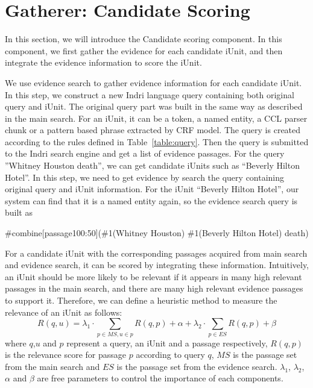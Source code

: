 \section{Gatherer: Candidate Scoring}
In this section, we will introduce the Candidate scoring component.
In this component, we first gather the evidence for each candidate iUnit, and then integrate the evidence information to score the iUnit.

We use evidence search to gather evidence information for each candidate iUnit.
In this step, we construct a new Indri language query containing both original query and iUnit.
The original query part was built in the same way as described in the main search.
For an iUnit, it can be a token, a named entity, a CCL parser chunk or a pattern based phrase extracted by CRF model.
The query is created according to the rules defined in Table~\ref{table:query}.
Then the query is submitted to the Indri search engine and get a list of evidence passages.
For the query ''Whitney Houston death'', we can get candidate iUnits such as ``Beverly Hilton Hotel''. 
In this step, we need to get evidence by search the query containing original query and iUnit information.
For the iUnit ``Beverly Hilton Hotel'', our system can find that it is a named entity again, so the evidence search query is built as 

\begin{center}
\#combine[passage100:50](\#1(Whitney Houston) \#1(Beverly Hilton Hotel) death)
\end{center}

For a candidate iUnit with the corresponding passages acquired from main search and evidence search, it can be scored by integrating these information.
Intuitively, an iUnit should be more likely to be relevant if it appears in many high relevant passages in the main search, and there are many high relevant evidence passages to support it.
Therefore, we can define a heuristic method to measure the relevance of an iUnit as follows:
\begin{equation}
R(q,u)= \lambda_1 \cdot \sum_{p\in MS, u\in p}{R(q,p) + \alpha} + \lambda_2 \cdot \sum_{p\in ES}{R(q,p) + \beta}
\end{equation}
where $q$,$u$ and $p$ represent a query, an iUnit and a passage respectively, $R(q,p)$ is the relevance score for passage $p$ according to query $q$, $MS$ is the passage set from the main search and $ES$ is the passage set from the evidence search. $\lambda_1$, $\lambda_2$, $\alpha$ and $\beta$ are free parameters to control the importance of each components.

